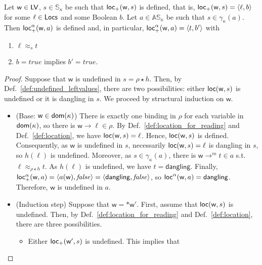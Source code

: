 \begin{proposition}
  \label{prop:abstract_location_correctness}
  Let $\mathsf{w}\in\mathsf{LV}$, $s\in\mathbb{S}_\kappa$ be such that
  $\mathsf{loc}_+(\mathsf{w},s)$ is defined,
  that is, $\mathsf{loc}_+(\mathsf{w},s)=\langle\ell,b\rangle$ for some $\ell\in\mathsf{Locs}$
  and some Boolean $b$.
  Let $a\in\mathbb{AS}_\kappa$ be such that $s\in\gamma_\kappa(a)$.
  Then $\mathsf{loc}^\alpha_+(\mathsf{w},a)$ is defined and, in particular,
  $\mathsf{loc}^\alpha_+(\mathsf{w},a)=\langle t,b'\rangle$ with
  \begin{enumerate}
  \item $\ell\approx_st$
  \item $b=\mathit{true}$ implies $b'=\mathit{true}$.
  \end{enumerate}
\end{proposition}
\begin{proof}
  Suppose that $\mathsf{w}$ is undefined in $s=\rho\star h$. Then,
  by Def.~\ref{def:undefined_leftvalues}, there are
  two possibilities: either $\mathsf{loc}(\mathsf{w},s)$ is undefined or it is
  dangling in $s$. We proceed by structural induction on $\mathsf{w}$.
  \begin{itemize}
    \item (Base: $\mathsf{w}\in\mathsf{dom}(\kappa)$)
    There is exactly one binding in $\rho$ for each variable in
    $\mathsf{dom}(\kappa)$, so there is $\mathsf{w}\to\ell\in\rho$.
    By Def.~\ref{def:location_for_reading} and Def.~\ref{def:location},
    we have $\mathsf{loc}(\mathsf{w},s)=\ell$. Hence, $\mathsf{loc}(\mathsf{w},s)$ is defined.
    Consequently, as $\mathsf{w}$ is undefined in $s$, necessarily
    $\mathsf{loc}(\mathsf{w},s)=\ell$ is dangling in $s$, so $h(\ell)$ is
    undefined. Moreover, as $s\in\gamma_\kappa(a)$, there is
    $\mathsf{w}\to^m t\in a$ s.t. $\ell\approx_{\rho\star h}t$.
    As $h(\ell)$ is undefined, we have $t=\mathsf{dangling}$.
    Finally, $\mathsf{loc_+^\alpha}(\mathsf{w},a)=\langle a(\mathsf{w}),\mathit{false}\rangle
    =\langle \mathsf{dangling},\mathit{false}\rangle$, so
    $\mathsf{loc}^\alpha(\mathsf{w},a)=\mathsf{dangling}$. Therefore, $\mathsf{w}$ is
    undefined in $a$.
    \item (Induction step) Suppose that $\mathsf{w} = \mathtt{*}\mathsf{w}'$.
    First, assume that $\mathsf{loc}(\mathsf{w},s)$ is undefined. Then,
    by Def.~\ref{def:location_for_reading} and Def.~\ref{def:location}, there
    are three possibilities.
    \begin{itemize}
      \item Either $\mathsf{loc_+}(\mathsf{w'},s)$ is undefined. This implies that

\end{itemize}
\end{itemize}
\end{proof}
